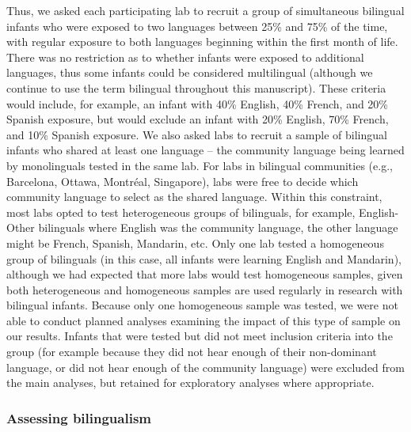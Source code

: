 \documentclass[
  english,
  ,man,floatsintext]{apa6}
\begin{document}
Thus, we asked each participating lab to recruit a group of simultaneous bilingual infants who were exposed to two languages between 25\% and 75\% of the time, with regular exposure to both languages beginning within the first month of life. There was no restriction as to whether infants were exposed to additional languages, thus some infants could be considered multilingual (although we continue to use the term bilingual throughout this manuscript). These criteria would include, for example, an infant with 40\% English, 40\% French, and 20\% Spanish exposure, but would exclude an infant with 20\% English, 70\% French, and 10\% Spanish exposure. We also asked labs to recruit a sample of bilingual infants who shared at least one language -- the community language being learned by monolinguals tested in the same lab. For labs in bilingual communities (e.g., Barcelona, Ottawa, Montréal, Singapore), labs were free to decide which community language to select as the shared language. Within this constraint, most labs opted to test heterogeneous groups of bilinguals, for example, English-Other bilinguals where English was the community language, the other language might be French, Spanish, Mandarin, etc. Only one lab tested a homogeneous group of bilinguals (in this case, all infants were learning English and Mandarin), although we had expected that more labs would test homogeneous samples, given both heterogeneous and homogeneous samples are used regularly in research with bilingual infants. Because only one homogeneous sample was tested, we were not able to conduct planned analyses examining the impact of this type of sample on our results. Infants that were tested but did not meet inclusion criteria into the group (for example because they did not hear enough of their non-dominant language, or did not hear enough of the community language) were excluded from the main analyses, but retained for exploratory analyses where appropriate.

\hypertarget{assessing-bilingualism}{%
\subsubsection{Assessing bilingualism}\label{assessing-bilingualism}}
\end{document}

